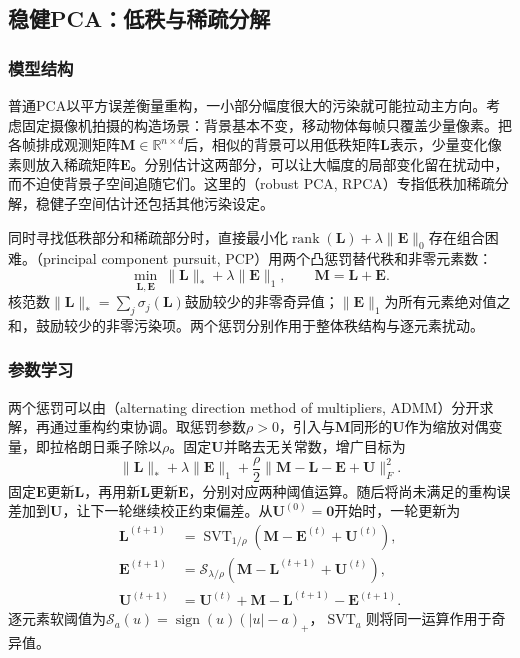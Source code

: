 \subsection{稳健PCA：低秩与稀疏分解}

\label{sec:dim-robust-pca}

\subsubsection{模型结构}

普通PCA以平方误差衡量重构，一小部分幅度很大的污染就可能拉动主方向。考虑固定摄像机拍摄的构造场景：背景基本不变，移动物体每帧只覆盖少量像素。把各帧排成观测矩阵$\bm{M}\in\mathbb{R}^{n\times d}$后，相似的背景可以用低秩矩阵$\bm{L}$表示，少量变化像素则放入稀疏矩阵$\bm{E}$。分别估计这两部分，可以让大幅度的局部变化留在扰动中，而不迫使背景子空间追随它们。这里的（robust PCA, RPCA）专指低秩加稀疏分解，稳健子空间估计还包括其他污染设定。

同时寻找低秩部分和稀疏部分时，直接最小化$\operatorname{rank}(\bm{L})+\lambda\lVert\bm{E}\rVert_0$存在组合困难。（principal component pursuit, PCP）用两个凸惩罚替代秩和非零元素数：
\begin{equation}
  \min_{\bm{L},\bm{E}}\
     \lVert\bm{L}\rVert_*+\lambda\lVert\bm{E}\rVert_1,
  \qquad \bm{M}=\bm{L}+\bm{E}.
  \label{eq:dim-pcp}
\end{equation}
核范数$\lVert\bm{L}\rVert_*=\sum_j\sigma_j(\bm{L})$鼓励较少的非零奇异值；$\lVert\bm{E}\rVert_1$为所有元素绝对值之和，鼓励较少的非零污染项。两个惩罚分别作用于整体秩结构与逐元素扰动。

\subsubsection{参数学习}

两个惩罚可以由（alternating direction method of multipliers, ADMM）分开求解，再通过重构约束协调。取惩罚参数$\rho>0$，引入与$\bm{M}$同形的$\bm{U}$作为缩放对偶变量，即拉格朗日乘子除以$\rho$。固定$\bm{U}$并略去无关常数，增广目标为
\[
  \lVert\bm{L}\rVert_*+\lambda\lVert\bm{E}\rVert_1
  +\frac{\rho}{2}
   \lVert\bm{M}-\bm{L}-\bm{E}+\bm{U}\rVert_F^2.
\]
固定$\bm{E}$更新$\bm{L}$，再用新$\bm{L}$更新$\bm{E}$，分别对应两种阈值运算。随后将尚未满足的重构误差加到$\bm{U}$，让下一轮继续校正约束偏差。从$\bm{U}^{(0)}=\bm{0}$开始时，一轮更新为
\begin{equation}
  \begin{aligned}
  \bm{L}^{(t+1)}&=\operatorname{SVT}_{1/\rho}
                  (\bm{M}-\bm{E}^{(t)}+\bm{U}^{(t)}),\\
  \bm{E}^{(t+1)}&=\mathcal{S}_{\lambda/\rho}
                  (\bm{M}-\bm{L}^{(t+1)}+\bm{U}^{(t)}),\\
  \bm{U}^{(t+1)}&=\bm{U}^{(t)}
                   +\bm{M}-\bm{L}^{(t+1)}-\bm{E}^{(t+1)}.
  \end{aligned}
  \label{eq:dim-rpca-admm}
\end{equation}
逐元素软阈值为$\mathcal{S}_{a}(u)=\operatorname{sign}(u)(|u|-a)_+$，$\operatorname{SVT}_{a}$则将同一运算作用于奇异值。

